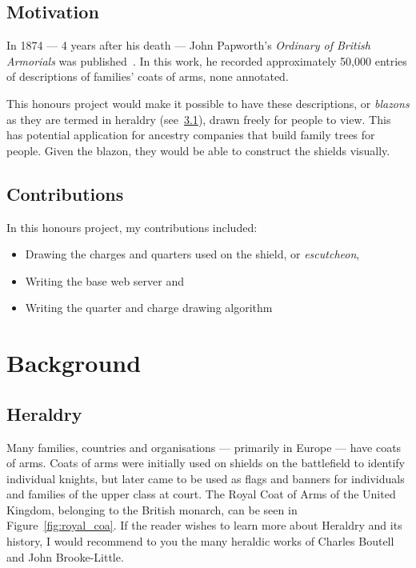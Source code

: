 \documentclass[nobib, a4paper, twoside, justified]{tufte-book}
\makeatletter
\newcommand{\charge}{\gls{charge}\@\xspace}
\newcommand{\charges}{\glspl{charge}\@\xspace}
\makeatother
\begin{document}
\section{Motivation}\label{sec:motivation}

In 1874 --- 4 years after his death --- John Papworth's \textit{Ordinary of British Armorials} was
published~\autocite{collins_1942}. In this work, he recorded approximately 50,000 entries of
descriptions of families' coats of arms, none annotated.

This honours project would make it possible to have these descriptions, or \textit{\glspl{blazon}}
as they are termed in heraldry (see~\ref{sec:heraldry}), drawn freely for people to view. This has
potential application for ancestry companies that build family trees for people. Given the blazon,
they would be able to construct the shields visually.

\section{Contributions}\label{sec:contributions}

In this honours project, my contributions included:

\begin{itemize}
  \item Drawing the \charges{} and quarters used on the shield, or \textit{\gls{escutcheon}},
  \item Writing the base web server and
  \item Writing the quarter and \charge{} drawing algorithm
\end{itemize}

\chapter{Background}\label{cha:background}

\section{Heraldry}\label{sec:heraldry}

Many families, countries and organisations --- primarily in Europe --- have coats of arms. Coats of
arms were initially used on shields on the battlefield to identify individual knights, but later
came to be used as flags and banners for individuals and families of the upper class at court. The
Royal Coat of Arms of the United Kingdom, belonging to the British monarch, can be seen in
Figure~\ref{fig:royal_coa}. If the reader wishes to learn more about Heraldry and its history, I
would recommend to you the many heraldic works of Charles Boutell and John Brooke-Little.
\end{document}
